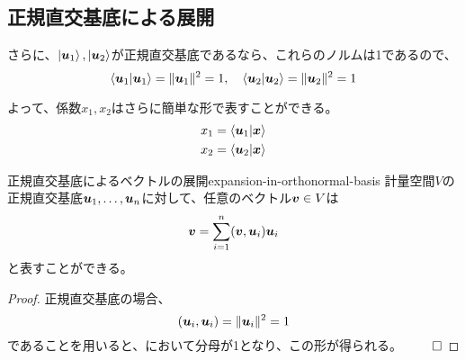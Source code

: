 \documentclass[../../../topic_linear-algebra]{subfiles}
\begin{document}
\subsection{正規直交基底による展開}

さらに、$\ket{\vb*{u}_1}, \ket{\vb*{u}_2}$が正規直交基底であるなら、これらのノルムは1であるので、
\begin{equation*}
  \braket{\vb*{u}_1|\vb*{u}_1} = \|\vb*{u}_1\|^2 = 1, \quad \braket{\vb*{u}_2|\vb*{u}_2} = \|\vb*{u}_2\|^2 = 1
\end{equation*}

よって、係数$x_1, x_2$はさらに簡単な形で表すことができる。
\begin{align*}
  x_1 & = \braket{\vb*{u}_1|\vb*{x}} \\
  x_2 & = \braket{\vb*{u}_2|\vb*{x}}
\end{align*}

\begin{theorem}{正規直交基底によるベクトルの展開}{expansion-in-orthonormal-basis}
  計量空間$V$の正規直交基底$\vb*{u}_1, \ldots, \vb*{u}_n$に対して、任意のベクトル$\vb*{v} \in V$は
  \begin{equation*}
    \vb*{v} = \sum_{i=1}^n (\vb*{v}, \vb*{u}_i) \vb*{u}_i
  \end{equation*}
  と表すことができる。
\end{theorem}

\begin{proof}
  正規直交基底の場合、
  \begin{equation*}
    (\vb*{u}_i,\vb*{u}_i) = \|\vb*{u}_i\|^2 = 1
  \end{equation*}
  であることを用いると、において分母が1となり、この形が得られる。 $\qed$
\end{proof}
\end{document}
